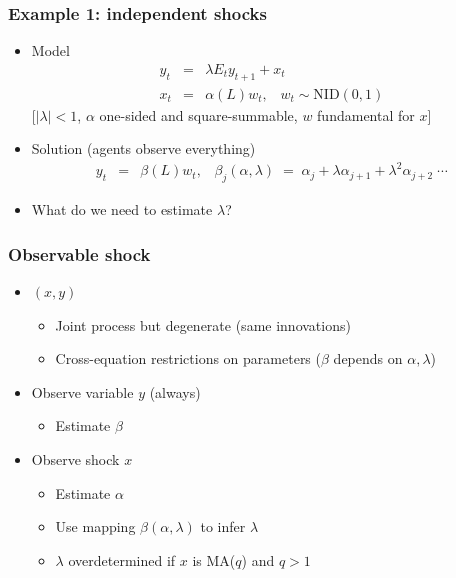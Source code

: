 \documentclass{beamer}
\begin{document}
\begin{frame}
\frametitle{Example 1:  independent shocks}
\begin{itemize} \itemsep=\bigskipamount
\item Model
\begin{eqnarray*}
    y_t &=& \lambda E_t y_{t+1} + x_t \phantom{xxx} \\
    x_t &=& \alpha(L) w_t, \;\;\;   w_t \sim \mbox{NID}(0,1)  %
\end{eqnarray*}
[$|\lambda|<1$, $\alpha$ one-sided and square-summable, $w$ fundamental for $x$]
\item Solution (agents observe everything)
\begin{eqnarray*}
    y_t &=& \beta(L) w_t, \;\;\;
    \beta_j (\alpha,\lambda) \;=\; \alpha_j + \lambda \alpha_{j+1} + \lambda^2 \alpha_{j+2} \; \cdots
\end{eqnarray*}

\item What do we need to estimate $\lambda$?
\end{itemize}
\end{frame}

\begin{frame}
\frametitle{Observable shock}
\begin{itemize}  \itemsep=\bigskipamount
\item $(x,y)$ \\
\begin{itemize}
\item Joint process but degenerate (same innovations)
\item Cross-equation restrictions on parameters ($\beta$ depends on $\alpha, \lambda$)
\end{itemize}
\item Observe variable $y$ (always) \\
\begin{itemize}
\item Estimate $\beta$
\end{itemize}
\item Observe shock $x$ \\
\begin{itemize}
\item Estimate $\alpha$
\item Use mapping $\beta(\alpha,\lambda)$ to infer $\lambda$
\item $\lambda$ overdetermined if $x$ is MA($q$) and $q>1$
\end{itemize}
\end{itemize}
\end{frame}
\end{document}
